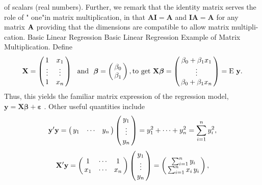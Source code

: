 \documentclass[11pt]{article}
\begin{document}
of scalars (real numbers). Further, we remark that the identity matrix serves
the role of " one"in matrix multiplication, in that \(\mathbf{A I}=\mathbf{A}\) and \(\mathbf{I A}=\mathbf{A}\) for any
matrix \({\bf A}\) providing that the dimensions are compatible to allow matrix multipli-
cation.
 Basic Linear Regression
 Basic Linear Regression Example of Matrix Multiplication. Define
\[
\mathbf{X}=\left( \! \! \begin{array} {c c} {1} & {x_{1}} \\ {\vdots} & {\vdots} \\ {1} & {x_{n}} \\ \end{array} \! \! \right) \ \ \mathrm{a n d} \ \ \boldsymbol{\beta}=\left( \! \! \begin{array} {c} {\beta_{0}} \\ {\beta_{1}} \\ \end{array} \! \! \right) , \mathrm{t o ~ g e t ~} \mathbf{X} \boldsymbol{\beta}=\left( \! \! \begin{array} {c} {\beta_{0}+\beta_{1} x_{1}} \\ {\vdots} \\ {\beta_{0}+\beta_{1} x_{n}} \\ \end{array} \! \! \right)=\mathrm{E} \ \mathbf{y} .
\]
Thus, this yields the familiar matrix expression of the regression model,
\(\mathbf{y}=\mathbf{X} \boldsymbol{\beta}+\boldsymbol{\varepsilon}\) . Other useful quantities include
\[
\mathbf{y}^{\prime} \mathbf{y}=\left( \! \! \begin{array} {c c c} {y_{1}} & {\cdots} & {y_{n}} \\ \end{array} \! \! \right) \left( \! \! \begin{array} {c} {y_{1}} \\ {\vdots} \\ {y_{n}} \\ \end{array} \! \! \right)=y_{1}^{2}+\cdots+y_{n}^{2}=\sum_{i=1}^{n} y_{i}^{2} ,
\]
\[
\mathbf{X}^{\prime} \mathbf{y}=\left( \! \! \begin{array} {c c c} {1} & {\cdots} & {1} \\ {x_{1}} & {\cdots} & {x_{n}} \\ \end{array} \! \! \right) \left( \! \! \begin{array} {c} {y_{1}} \\ {\vdots} \\ {y_{n}} \\ \end{array} \! \! \right)=\left( \! \! \begin{array} {c} {\sum_{i=1}^{n} y_{i}} \\ {\sum_{i=1}^{n} x_{i} \, y_{i}} \\ \end{array} \! \! \right) ,
\]
\end{document}
